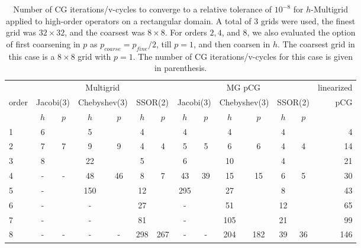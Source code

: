 \begin{table}
  \caption{\label{tab:box} Number of CG iterations/v-cycles to converge to a relative tolerance of $10^{-8}$ for $h$-Multigrid applied to high-order operators on a rectangular domain. A total of 3 grids were used, the finest grid was $32\times 32$, and the coarsest was $8\times 8$. For orders $2,4$, and $8$, we also evaluated the option of first coarsening in $p$ as $p_{coarse} = p_{fine}/2$, till $p=1$, and then coarsen in $h$. The coarsest grid in this case is a $8\times 8$ grid with $p=1$. The number of CG iterations/v-cycles for this case is given in parenthesis.}
		\centering
    \begin{tabular}{|l|c|c|c|c|c|c|c|c|c|c|c|c|r|} 
\hline
                     & \multicolumn{6}{c|}{Multigrid} & \multicolumn{6}{c|}{MG pCG} &          linearized \\
										 \cline{2-13}
			order &  \multicolumn{2}{c|}{\scriptsize  Jacobi(3)} &  \multicolumn{2}{c|}{\scriptsize Chebyshev(3)} & \multicolumn{2}{c|}{\scriptsize  SSOR(2)} & \multicolumn{2}{c|}{\scriptsize Jacobi(3)} &  \multicolumn{2}{c|}{\scriptsize Chebyshev(3)} & \multicolumn{2}{c|}{\scriptsize SSOR(2)} & pCG\\
\hline
 & $h$ & $p$ & $h$ & $p$& $h$ & $p$& $h$ & $p$& $h$ & $p$& $h$ & $p$& \\
 \cline{2-14}
                   1 &       6 &    &                         5 &    &                 4 &   &                    4 &     &                      4 &      &               4 &   &    4\\
                   2 &   7     & 7  &                         9 & 9  &                 4 & 4 &                    5 &  5  &                      6 &  6   &               4 & 4 &   14\\
                   3 &       8 &    &                        22 &    &                 5 &   &                    6 &     &                     10 &      &               4 &   &   21\\
                   4 &       - & -  &                        48 & 46 &                 8 & 7 &                   43 & 39  &                     15 &  15  &               6 & 5 &   30\\
                   5 &       - &    &                       150 &    &                12 &   &                  295 &     &                     27 &      &               8 &   &   43\\
                   6 &       - &    &                         - &    &                27 &   &                    - &     &                     51 &      &              12 &   &   65\\
                   7 &       - &    &                         - &    &                81 &   &                    - &     &                    105 &      &              21 &   &   99\\
                   8 &       - & -  &                         - & -  &                298&267&                    - &  -  &                    204 &  182 &              39 &36 &  146\\
\hline
	  \end{tabular}
\end{table}

